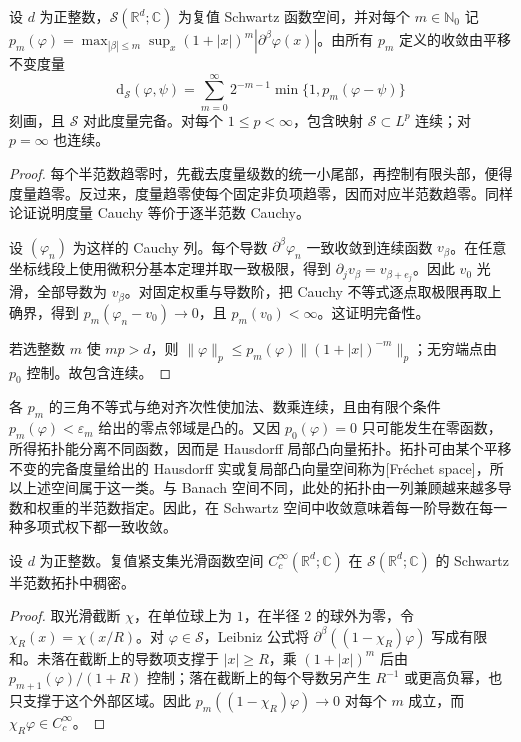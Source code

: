\begin{proposition}\label{b2:prop:05-schwartz-complete}
设 \(d\) 为正整数，\(\mathcal S(\mathbb R^d;\mathbb C)\) 为复值 Schwartz 函数空间，并对每个 \(m\in\mathbb N_0\) 记 \(p_m(\varphi)=\max_{|\beta|\leq m}\sup_x(1+|x|)^m|\partial^\beta\varphi(x)|\)。由所有 \(p_m\) 定义的收敛由平移不变度量
\[
 \mathrm{d}_{\mathcal S}(\varphi,\psi)
 =\sum_{m=0}^\infty2^{-m-1}\min\{1,p_m(\varphi-\psi)\}
\]
刻画，且 \(\mathcal S\) 对此度量完备。对每个 \(1\leq p<\infty\)，包含映射 \(\mathcal S\subset L^p\) 连续；对 \(p=\infty\) 也连续。
\end{proposition}
\begin{proof}
每个半范数趋零时，先截去度量级数的统一小尾部，再控制有限头部，便得度量趋零。反过来，度量趋零使每个固定非负项趋零，因而对应半范数趋零。同样论证说明度量 Cauchy 等价于逐半范数 Cauchy。

设 \((\varphi_n)\) 为这样的 Cauchy 列。每个导数 \(\partial^\beta\varphi_n\) 一致收敛到连续函数 \(v_\beta\)。在任意坐标线段上使用微积分基本定理并取一致极限，得到 \(\partial_jv_\beta=v_{\beta+e_j}\)。因此 \(v_0\) 光滑，全部导数为 \(v_\beta\)。对固定权重与导数阶，把 Cauchy 不等式逐点取极限再取上确界，得到 \(p_m(\varphi_n-v_0)\to0\)，且 \(p_m(v_0)<\infty\)。这证明完备性。

若选整数 \(m\) 使 \(mp>d\)，则 \(\|\varphi\|_p\leq p_m(\varphi)\|(1+|x|)^{-m}\|_p\)；无穷端点由 \(p_0\) 控制。故包含连续。
\end{proof}

各 \(p_m\) 的三角不等式与绝对齐次性使加法、数乘连续，且由有限个条件 \(p_m(\varphi)<\varepsilon_m\) 给出的零点邻域是凸的。又因 \(p_0(\varphi)=0\) 只可能发生在零函数，所得拓扑能分离不同函数，因而是 Hausdorff 局部凸向量拓扑。拓扑可由某个平移不变的完备度量给出的 Hausdorff 实或复局部凸向量空间称为[Fréchet space]，所以上述空间属于这一类。与 Banach 空间不同，此处的拓扑由一列兼顾越来越多导数和权重的半范数指定。因此，在 Schwartz 空间中收敛意味着每一阶导数在每一种多项式权下都一致收敛。

\begin{proposition}\label{b2:prop:05-compact-cutoff}
设 \(d\) 为正整数。复值紧支集光滑函数空间 \(C_c^\infty(\mathbb R^d;\mathbb C)\) 在 \(\mathcal S(\mathbb R^d;\mathbb C)\) 的 Schwartz 半范数拓扑中稠密。
\end{proposition}
\begin{proof}
取光滑截断 \(\chi\)，在单位球上为 \(1\)，在半径 \(2\) 的球外为零，令 \(\chi_R(x)=\chi(x/R)\)。对 \(\varphi\in\mathcal S\)，Leibniz 公式将 \(\partial^\beta((1-\chi_R)\varphi)\) 写成有限和。未落在截断上的导数项支撑于 \(|x|\geq R\)，乘 \((1+|x|)^m\) 后由 \(p_{m+1}(\varphi)/(1+R)\) 控制；落在截断上的每个导数另产生 \(R^{-1}\) 或更高负幂，也只支撑于这个外部区域。因此 \(p_m((1-\chi_R)\varphi)\to0\) 对每个 \(m\) 成立，而 \(\chi_R\varphi\in C_c^\infty\)。
\end{proof}

